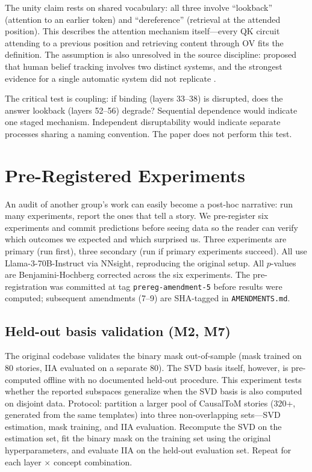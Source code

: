 \documentclass{article}
\begin{document}
The unity claim rests on shared vocabulary: all three involve ``lookback'' (attention to an earlier token) and ``dereference'' (retrieval at the attended position). This describes the attention mechanism itself---every QK circuit attending to a previous position and retrieving content through OV fits the definition. The assumption is also unresolved in the source discipline: \citet{apperly2009humans} proposed that human belief tracking involves two distinct systems, and the strongest evidence for a single automatic system \citep{kovacs2010social} did not replicate \citep{phillips2015second}.

The critical test is coupling: if binding (layers 33--38) is disrupted, does the answer lookback (layers 52--56) degrade? Sequential dependence would indicate one staged mechanism. Independent disruptability would indicate separate processes sharing a naming convention. The paper does not perform this test.


\section{Pre-Registered Experiments}
\label{sec:experiments}

An audit of another group's work can easily become a post-hoc narrative: run many experiments, report the ones that tell a story. We pre-register six experiments and commit predictions before seeing data so the reader can verify which outcomes we expected and which surprised us. Three experiments are primary (run first), three secondary (run if primary experiments succeed). All use Llama-3-70B-Instruct via NNsight, reproducing the original setup. All $p$-values are Benjamini-Hochberg corrected across the six experiments. The pre-registration was committed at tag \texttt{prereg-amendment-5} before results were computed; subsequent amendments (7--9) are SHA-tagged in \texttt{AMENDMENTS.md}.

\subsection{Held-out basis validation (M2, M7)}

The original codebase validates the binary mask out-of-sample (mask trained on 80 stories, IIA evaluated on a separate 80). The SVD basis itself, however, is pre-computed offline with no documented held-out procedure. This experiment tests whether the reported subspaces generalize when the SVD basis is also computed on disjoint data. Protocol: partition a larger pool of CausalToM stories (320+, generated from the same templates) into three non-overlapping sets---SVD estimation, mask training, and IIA evaluation. Recompute the SVD on the estimation set, fit the binary mask on the training set using the original hyperparameters, and evaluate IIA on the held-out evaluation set. Repeat for each layer $\times$ concept combination.
\end{document}
